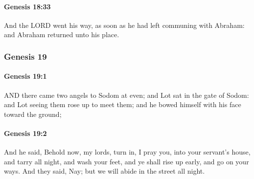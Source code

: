 		\paragraph{Genesis 18:33} %
			\label{GENESIS-18-33}

			And the LORD went his way, as soon as he had left communing with Abraham: and Abraham returned unto his place.


	\subsubsection{Genesis 19} %
		\label{GENESIS-19}
		
		\paragraph{Genesis 19:1} %
			\label{GENESIS-19-1}

			AND there came two angels to Sodom at even; and Lot sat in the gate of Sodom: and Lot seeing them rose up to meet them; and he bowed himself with his face toward the ground;


		\paragraph{Genesis 19:2} %
			\label{GENESIS-19-2}

			And he said, Behold now, my lords, turn in, I pray you, into your servant's house, and tarry all night, and wash your feet, and ye shall rise up early, and go on your ways.  And they said, Nay; but we will abide in the street all night.

